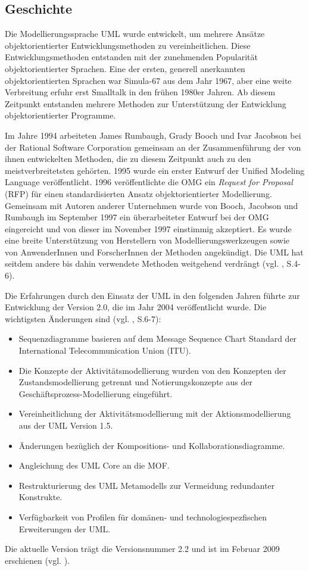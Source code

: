 \subsection{Geschichte}
Die Modellierungssprache UML wurde entwickelt, um mehrere Ansätze objektorientierter Entwicklungsmethoden zu vereinheitlichen. Diese Entwicklungsmethoden entstanden mit der zunehmenden Popularität objektorientierter Sprachen. Eine der ersten, generell anerkannten objektorientierten Sprachen war Simula-67 aus dem Jahr 1967, aber eine weite Verbreitung erfuhr erst Smalltalk in den frühen 1980er Jahren. Ab diesem Zeitpunkt entstanden mehrere Methoden zur Unterstützung der Entwicklung objektorientierter Programme.

Im Jahre 1994 arbeiteten James Rumbaugh, Grady Booch und Ivar Jacobson bei der Rational Software Corporation gemeinsam an der Zusammenführung der von ihnen entwickelten Methoden, die zu diesem Zeitpunkt auch zu den meistverbreitetsten gehörten. 1995 wurde ein erster Entwurf der Unified Modeling Language veröffentlicht. 1996 veröffentlichte die OMG ein \emph{Request for Proposal} (RFP) für einen standardisierten Ansatz objektorientierter Modellierung. Gemeinsam mit Autoren anderer Unternehmen wurde von Booch, Jacobson und Rumbaugh im September 1997 ein überarbeiteter Entwurf bei der OMG eingereicht und von dieser im November 1997 einstimmig akzeptiert. Es wurde eine breite Unterstützung von Herstellern von Modellierungswerkzeugen sowie von AnwenderInnen und ForscherInnen der Methoden angekündigt. Die UML hat seitdem andere bis dahin verwendete Methoden weitgehend verdrängt (vgl. \citep{RumbaughJacobsonBooch2005}, S.4-6).

Die Erfahrungen durch den Einsatz der UML in den folgenden Jahren führte zur Entwicklung der Version 2.0, die im Jahr 2004 veröffentlicht wurde. Die wichtigsten Änderungen sind  (vgl. \citep{RumbaughJacobsonBooch2005}, S.6-7):
\begin{itemize}
\item Sequenzdiagramme basieren auf dem Message Sequence Chart Standard der International Telecommunication Union (ITU).
\item Die Konzepte der Aktivitätsmodellierung wurden von den Konzepten der Zustandsmodellierung getrennt und Notierungskonzepte aus der Geschäftsprozess-Modellierung eingeführt.
\item Vereinheitlichung der Aktivitätsmodellierung mit der Aktionsmodellierung aus der UML Version 1.5.
\item Änderungen bezüglich der Kompositions- und Kollaborationsdiagramme.
\item Angleichung des UML Core an die MOF.
\item Restrukturierung des UML Metamodells zur Vermeidung redundanter Konstrukte.
\item Verfügbarkeit von Profilen für domänen- und technologiespezfischen Erweiterungen der UML.
\end{itemize}
Die aktuelle Version trägt die Versionsnummer 2.2 und ist im Februar 2009 erschienen (vgl. \citep{OMG2009}).


